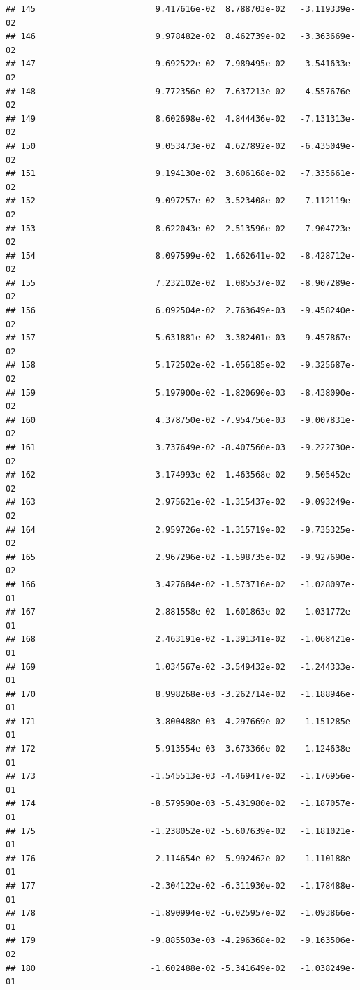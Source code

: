 \documentclass[
]{article}
\begin{document}
\begin{verbatim}
## 145                        9.417616e-02  8.788703e-02   -3.119339e-02
## 146                        9.978482e-02  8.462739e-02   -3.363669e-02
## 147                        9.692522e-02  7.989495e-02   -3.541633e-02
## 148                        9.772356e-02  7.637213e-02   -4.557676e-02
## 149                        8.602698e-02  4.844436e-02   -7.131313e-02
## 150                        9.053473e-02  4.627892e-02   -6.435049e-02
## 151                        9.194130e-02  3.606168e-02   -7.335661e-02
## 152                        9.097257e-02  3.523408e-02   -7.112119e-02
## 153                        8.622043e-02  2.513596e-02   -7.904723e-02
## 154                        8.097599e-02  1.662641e-02   -8.428712e-02
## 155                        7.232102e-02  1.085537e-02   -8.907289e-02
## 156                        6.092504e-02  2.763649e-03   -9.458240e-02
## 157                        5.631881e-02 -3.382401e-03   -9.457867e-02
## 158                        5.172502e-02 -1.056185e-02   -9.325687e-02
## 159                        5.197900e-02 -1.820690e-03   -8.438090e-02
## 160                        4.378750e-02 -7.954756e-03   -9.007831e-02
## 161                        3.737649e-02 -8.407560e-03   -9.222730e-02
## 162                        3.174993e-02 -1.463568e-02   -9.505452e-02
## 163                        2.975621e-02 -1.315437e-02   -9.093249e-02
## 164                        2.959726e-02 -1.315719e-02   -9.735325e-02
## 165                        2.967296e-02 -1.598735e-02   -9.927690e-02
## 166                        3.427684e-02 -1.573716e-02   -1.028097e-01
## 167                        2.881558e-02 -1.601863e-02   -1.031772e-01
## 168                        2.463191e-02 -1.391341e-02   -1.068421e-01
## 169                        1.034567e-02 -3.549432e-02   -1.244333e-01
## 170                        8.998268e-03 -3.262714e-02   -1.188946e-01
## 171                        3.800488e-03 -4.297669e-02   -1.151285e-01
## 172                        5.913554e-03 -3.673366e-02   -1.124638e-01
## 173                       -1.545513e-03 -4.469417e-02   -1.176956e-01
## 174                       -8.579590e-03 -5.431980e-02   -1.187057e-01
## 175                       -1.238052e-02 -5.607639e-02   -1.181021e-01
## 176                       -2.114654e-02 -5.992462e-02   -1.110188e-01
## 177                       -2.304122e-02 -6.311930e-02   -1.178488e-01
## 178                       -1.890994e-02 -6.025957e-02   -1.093866e-01
## 179                       -9.885503e-03 -4.296368e-02   -9.163506e-02
## 180                       -1.602488e-02 -5.341649e-02   -1.038249e-01

\end{verbatim}
\end{document}
